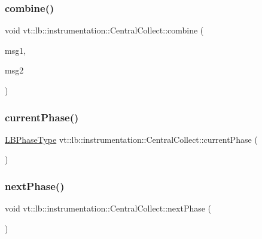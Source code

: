 \subsubsection{\texorpdfstring{combine()}{combine()}}
{\footnotesize\ttfamily void vt\+::lb\+::instrumentation\+::\+Central\+Collect\+::combine (\begin{DoxyParamCaption}\item[{\hyperlink{structvt_1_1lb_1_1instrumentation_1_1_collect_msg}{Collect\+Msg} $\ast$}]{msg1,  }\item[{\hyperlink{structvt_1_1lb_1_1instrumentation_1_1_collect_msg}{Collect\+Msg} $\ast$}]{msg2 }\end{DoxyParamCaption})\hspace{0.3cm}{\ttfamily [static]}}

\mbox{\label{structvt_1_1lb_1_1instrumentation_1_1_central_collect_ae9561fb73a1aa198c1b69941870b8a6a}} 
\subsubsection{\texorpdfstring{current\+Phase()}{currentPhase()}}
{\footnotesize\ttfamily \hyperlink{namespacevt_a5505d0bab25ce2ff566a8e015871b379}{L\+B\+Phase\+Type} vt\+::lb\+::instrumentation\+::\+Central\+Collect\+::current\+Phase (\begin{DoxyParamCaption}{ }\end{DoxyParamCaption})\hspace{0.3cm}{\ttfamily [static]}}

\mbox{\label{structvt_1_1lb_1_1instrumentation_1_1_central_collect_aa0cc1c988760bbb5d6f1fd008e827777}} 
\subsubsection{\texorpdfstring{next\+Phase()}{nextPhase()}}
{\footnotesize\ttfamily void vt\+::lb\+::instrumentation\+::\+Central\+Collect\+::next\+Phase (\begin{DoxyParamCaption}{ }\end{DoxyParamCaption})\hspace{0.3cm}{\ttfamily [static]}}

